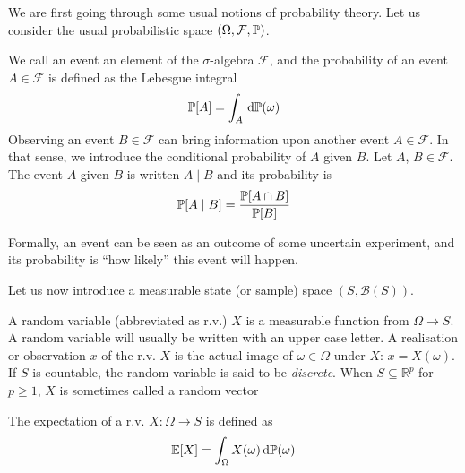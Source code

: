 \documentclass[../../Main_ManuscritThese.tex]{subfiles}
\begin{document}
We are first going through some usual notions of probability theory. 
Let us consider the usual probabilistic space $(\Omega, \mathcal{F}, \mathbb{P})$.
\begin{definition}
  \label{def:prob_event}
   We call an event an element of the $\sigma$-algebra $\mathcal{F}$, and the probability of an event $A\in \mathcal{F}$ is defined as the Lebesgue integral
  \begin{equation}
    \mathbb{P}[A] = \int_{A} \,\mathrm{d}\mathbb{P}(\omega)
  \end{equation}
Observing an event $B \in \mathcal{F}$ can bring information upon another event $A\in \mathcal{F}$. In that sense, we introduce the conditional probability of $A$ given $B$.
\label{def:cond_proba}
  Let $A$, $B \in \mathcal{F}$.
  The event $A$ given $B$ is written $A \mid B$ and its probability is
  \begin{equation}
    \mathbb{P}[A \mid B] = \frac{\mathbb{P}[A \cap B]}{\mathbb{P}[B]}
  \end{equation}
\end{definition}
Formally, an event can be seen as an outcome of some uncertain experiment, and its probability is ``how likely'' this event will happen.

Let us now introduce a measurable state (or sample) space $(S, \mathcal{B}(S))$.
\begin{definition}
  \label{def:random_variable}
  A random variable (abbreviated as r.v.) $X$ is a measurable function from $\Omega \longrightarrow S$. A random variable will usually be written with an upper case letter. A realisation or observation $x$ of the r.v. $X$ is the actual image of $\omega\in\Omega$ under $X$: $x = X(\omega)$. If $S$ is countable, the random variable is said to be \emph{discrete}. When $S\subseteq \mathbb{R}^p$ for $p\geq 1$, $X$ is sometimes called a random vector
  
  \label{def:expectation}
  The expectation of a r.v. $X:\Omega \rightarrow S$ is defined as
  \begin{equation}
    \mathbb{E}[X] = \int_{\Omega} X(\omega) \,\mathrm{d}\mathbb{P}(\omega)
  \end{equation}
\end{definition}
\end{document}
